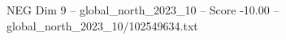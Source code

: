 \begin{textsample}{NEG Dim 9 – global\_north\_2023\_10 – Score -10.00 – global\_north\_2023\_10/102549634.txt}
\end{textsample}
